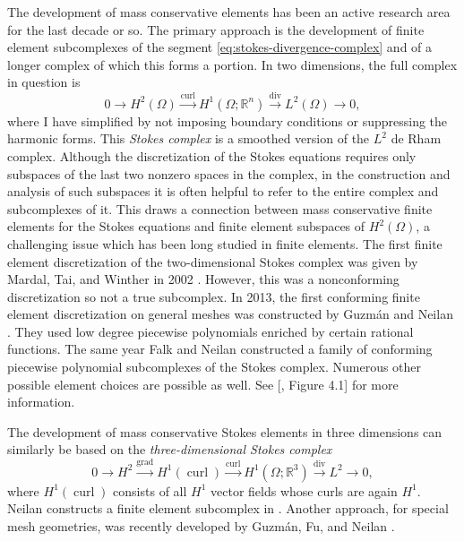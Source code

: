 {The development of mass conservative elements has been an active research area for the last decade or so. The primary approach is the development of finite element subcomplexes of the segment \eqref{eq:stokes-divergence-complex} and of a longer complex of which this forms a portion. In two dimensions, the full complex in question is}
\[
0\to H^2(\Omega)\xrightarrow{\operatorname{curl}}H^1(\Omega;\mathbb R^n)\xrightarrow{\operatorname{div}}L^2(\Omega)\to0,
\]
{where I have simplified by not imposing boundary conditions or suppressing the harmonic forms. This \emph{Stokes complex} is a smoothed version of the $L^2$ de Rham complex. Although the discretization of the Stokes equations requires only subspaces of the last two nonzero spaces in the complex, in the construction and analysis of such subspaces it is often helpful to refer to the entire complex and subcomplexes of it. This draws a connection between mass conservative finite elements for the Stokes equations and finite element subspaces of $H^2(\Omega)$, a challenging issue which has been long studied in finite elements. The first finite element discretization of the two-dimensional Stokes complex was given by Mardal, Tai, and Winther in 2002 . However, this was a nonconforming discretization so not a true subcomplex. In 2013, the first conforming finite element discretization on general meshes was constructed by Guzmán and Neilan . They used low degree piecewise polynomials enriched by certain rational functions. The same year Falk and Neilan  constructed a family of conforming piecewise polynomial subcomplexes of the Stokes complex. Numerous other possible element choices are possible as well. See [, Figure 4.1] for more information.}

{The development of mass conservative Stokes elements in three dimensions can similarly be based on the \emph{three-dimensional Stokes complex}}
\[
0\to H^2\xrightarrow{\operatorname{grad}}H^1(\operatorname{curl})\xrightarrow{\operatorname{curl}}H^1(\Omega;\mathbb R^3)\xrightarrow{\operatorname{div}}L^2\to0,
\]
{where $H^1(\operatorname{curl})$ consists of all $H^1$ vector fields whose curls are again $H^1$. Neilan constructs a finite element subcomplex in . Another approach, for special mesh geometries, was recently developed by Guzmán, Fu, and Neilan .}
